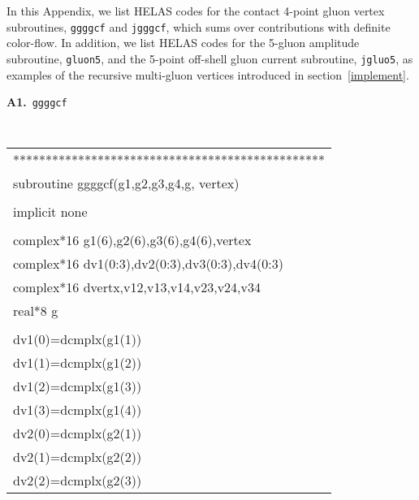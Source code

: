In this Appendix, we list HELAS codes for the contact 4-point
 gluon vertex subroutines,
 {\tt ggggcf} and {\tt jgggcf},
 which sums over contributions with definite color-flow.
 In addition, we list HELAS codes for the 5-gluon
 amplitude subroutine, {\tt gluon5}, and
 the 5-point off-shell gluon current subroutine,
 {\tt jgluo5}, as examples of the recursive multi-gluon
 vertices introduced in section~\ref{implement}.
 
 \vspace{2em}
\begin{center}
 {\bf A1.}~{\tt ggggcf}\\
{\tt 
\begin{supertabular}{l}
************************************************\\
     \hspace{0.5em} subroutine ggggcf(g1,g2,g3,g4,g, vertex)\\
\\
      \hspace{0.5em} implicit none\\
\\
      \hspace{0.5em} complex*16    g1(6),g2(6),g3(6),g4(6),vertex\\
      \hspace{0.5em} complex*16 dv1(0:3),dv2(0:3),dv3(0:3),dv4(0:3)\\
      \hspace{0.5em} complex*16 dvertx,v12,v13,v14,v23,v24,v34\\
      \hspace{0.5em} real*8 g\\
\\
      \hspace{0.5em} dv1(0)=dcmplx(g1(1))\\
      \hspace{0.5em} dv1(1)=dcmplx(g1(2))\\
      \hspace{0.5em} dv1(2)=dcmplx(g1(3))\\
      \hspace{0.5em} dv1(3)=dcmplx(g1(4))\\
      \hspace{0.5em} dv2(0)=dcmplx(g2(1))\\
      \hspace{0.5em} dv2(1)=dcmplx(g2(2))\\
      \hspace{0.5em} dv2(2)=dcmplx(g2(3))\\

\end{supertabular}}
\end{center}
